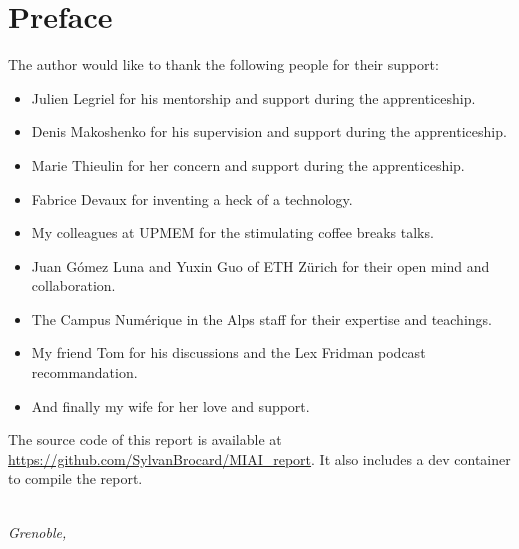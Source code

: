 \chapter*{Preface}

The author would like to thank the following people for their support:
\begin{itemize}
    \item Julien Legriel for his mentorship and support during the apprenticeship.
    \item Denis Makoshenko for his supervision and support during the apprenticeship.
    \item Marie Thieulin for her concern and support during the apprenticeship.
    \item Fabrice Devaux for inventing a heck of a technology.
    \item My colleagues at UPMEM for the stimulating coffee breaks talks.
    \item Juan Gómez Luna and Yuxin Guo of ETH Zürich for their open mind and collaboration.
    \item The Campus Numérique in the Alps staff for their expertise and teachings.
    \item My friend Tom for his discussions and the Lex Fridman podcast recommandation.
    \item And finally my wife for her love and support.
\end{itemize}

The source code of this report is available at \url{https://github.com/SylvanBrocard/MIAI_report}. It also includes a dev container to compile the report.

\begin{flushright}
{\makeatletter\itshape
    \@author \\
    Grenoble, \monthname{} \the\year{}
\makeatother}
\end{flushright}
